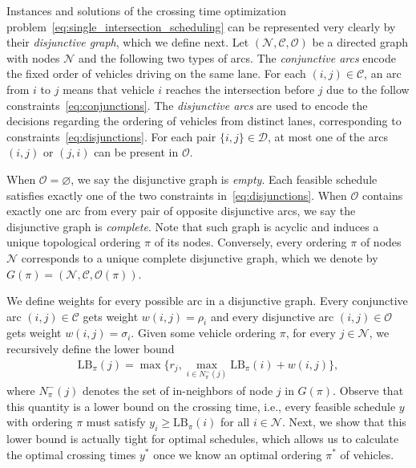 \documentclass[a4paper]{article}
\theoremstyle{definition}
\theoremstyle{plain}
\begin{document}
Instances and solutions of the crossing time optimization problem~\eqref{eq:single_intersection_scheduling} can be
represented very clearly by their \textit{disjunctive graph}, which we define next. Let
$(\mathcal{N}, \mathcal{C}, \mathcal{O})$ be a directed graph with nodes
$\mathcal{N}$ and the following two types of arcs. The \textit{conjunctive arcs} encode
the fixed order of vehicles driving on the same lane. For each
$(i,j) \in \mathcal{C}$, an arc from $i$ to $j$ means that vehicle $i$ reaches the
intersection before $j$ due to the follow constraints~\eqref{eq:conjunctions}. The \textit{disjunctive arcs}
are used to encode the decisions regarding the ordering of vehicles from
distinct lanes, corresponding to constraints~\eqref{eq:disjunctions}. For each pair
$\{i,j\} \in \mathcal{D}$, at most one of the arcs $(i,j)$ or $(j,i)$ can be present
in $\mathcal{O}$.

When $\mathcal{O} = \varnothing$, we say the disjunctive graph is
\textit{empty}. Each feasible schedule satisfies exactly one of the two
constraints in~\eqref{eq:disjunctions}. When $\mathcal{O}$ contains exactly one arc from every pair
of opposite disjunctive arcs, we say the disjunctive graph is \textit{complete}.
Note that such graph is acyclic and induces a unique topological ordering $\pi$
of its nodes. Conversely, every ordering $\pi$ of nodes $\mathcal{N}$ corresponds
to a unique complete disjunctive graph, which we denote by
$G(\pi) = (\mathcal{N}, \mathcal{C}, \mathcal{O}(\pi))$.

We define weights for every possible arc in a disjunctive graph. Every
conjunctive arc $(i, j) \in \mathcal{C}$ gets weight $w(i,j) = \rho_{i}$ and every
disjunctive arc $(i, j) \in \mathcal{O}$ gets weight $w(i,j) = \sigma_{i}$. Given
some vehicle ordering $\pi$, for every $j \in \mathcal{N}$, we recursively define
the lower bound
\begin{align}
  \text{LB}_\pi(j) = \max\{ r_{j}, \max_{i \in N^{-}_{\pi}(j)} \text{LB}_\pi(i) + w(i,j) \} ,
\end{align}
where $N^{-}_{\pi}(j)$ denotes the set of in-neighbors of node $j$ in $G(\pi)$.
Observe that this quantity is a lower bound on the crossing time, i.e., every
feasible schedule $y$ with ordering $\pi$ must satisfy $y_{i} \geq \text{LB}_\pi(i)$
for all $i \in \mathcal{N}$.
%
Next, we show that this lower bound is actually tight for optimal schedules,
which allows us to calculate the optimal crossing times $y^{*}$ once we know an
optimal ordering $\pi^{*}$ of vehicles.
\end{document}
